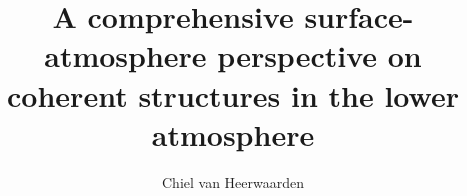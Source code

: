 \usepackage[utf8]{inputenc}





\newcommand*{\todo}[1]{\textbf{\color{red}[TODO: #1]}}

\title{A comprehensive surface-atmosphere perspective on coherent structures in the lower atmosphere}
\author[van Heerwaarden]{Chiel van Heerwaarden}

\newcommand{\ercyear}{2024} %
\newcommand{\erctype}{Synergy} %


